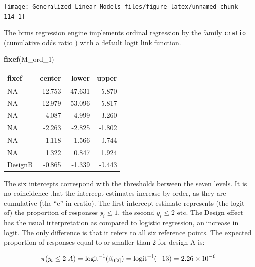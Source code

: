 \documentclass[]{svmono}
\newenvironment{Shaded}{\begin{snugshade}}{\end{snugshade}}
\newcommand{\KeywordTok}[1]{\textcolor[rgb]{0.13,0.29,0.53}{\textbf{#1}}}
\newcommand{\DataTypeTok}[1]{\textcolor[rgb]{0.13,0.29,0.53}{#1}}
\newcommand{\DecValTok}[1]{\textcolor[rgb]{0.00,0.00,0.81}{#1}}
\newcommand{\StringTok}[1]{\textcolor[rgb]{0.31,0.60,0.02}{#1}}
\newcommand{\OperatorTok}[1]{\textcolor[rgb]{0.81,0.36,0.00}{\textbf{#1}}}
\newcommand{\NormalTok}[1]{#1}
\begin{document}
\texttt{[image: Generalized\_Linear\_Models\_files/figure-latex/unnamed-chunk-114-1]}

The brms regression engine implements ordinal regression by the family
\texttt{cratio} (cumulative odds ratio ) with a default logit link
function.

\begin{Shaded}
\end{Shaded}

\begin{Shaded}
\begin{Highlighting}[]
\KeywordTok{fixef}\NormalTok{(M_ord_}\DecValTok{1}\NormalTok{)}
\end{Highlighting}
\end{Shaded}

\begin{longtable}[]{@{}lrrr@{}}
\toprule
fixef & center & lower & upper\tabularnewline
\midrule
\endhead
NA & -12.753 & -47.631 & -5.870\tabularnewline
NA & -12.979 & -53.096 & -5.817\tabularnewline
NA & -4.087 & -4.999 & -3.260\tabularnewline
NA & -2.263 & -2.825 & -1.802\tabularnewline
NA & -1.118 & -1.566 & -0.744\tabularnewline
NA & 1.322 & 0.847 & 1.924\tabularnewline
DesignB & -0.865 & -1.339 & -0.443\tabularnewline
\bottomrule
\end{longtable}

The six intercepts correspond with the thresholds between the seven
levels. It is no coincidence that the intercept estimates increase by
order, as they are cumulative (the ``c'' in cratio). The first intercept
estimate represents (the logit of) the proportion of responses
\(y_i \leq 1\), the second \(y_i \leq 2\) etc. The Design effect has the
usual interpretation as compared to logistic regression, an increase in
logit. The only difference is that it refers to all six reference
points. The expected proportion of responses equal to or smaller than 2
for design A is:

\[
\pi(y_i \leq 2|A) = \\
\text{logit}^{-1}(\beta_{0[2]}) = \\ 
\text{logit}^{-1}(-13) = \\
2.26\times 10^{-6}
\]
\end{document}
